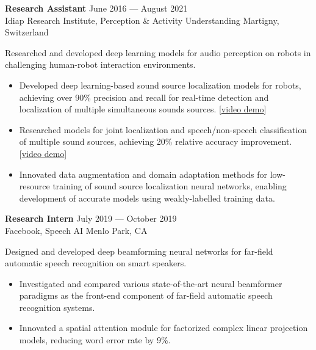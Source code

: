 \documentclass[a4paper,9pt]{extarticle} %
\begin{document}
\textbf{Research Assistant} \hfill June 2016 --- August 2021 \\
Idiap Research Institute, Perception \& Activity Understanding  \hfill Martigny, Switzerland \\
\vspace{-1.5\parskip}

Researched and developed deep learning models for audio perception on robots in challenging human-robot interaction environments.
\vspace{-.9\parskip}
\begin{itemize}[nosep]
  \item Developed deep learning-based sound source localization models for robots, achieving over 90\% precision and recall for real-time detection and localization of multiple simultaneous sounds sources. [\href{https://www.youtube.com/watch?v=_4EwuVlE_pU}{video demo}]
  \item Researched models for joint localization and speech/non-speech classification of multiple sound sources, achieving 20\% relative accuracy improvement. [\href{https://www.youtube.com/watch?v=O7bQvg03RTc}{video demo}]
  \item Innovated data augmentation and domain adaptation methods for low-resource training of sound source localization neural networks, enabling development of accurate models using weakly-labelled training data.
\end{itemize}


\textbf{Research Intern} \hfill July 2019 --- October 2019 \\
Facebook, Speech AI  \hfill Menlo Park, CA \\
\vspace{-1.5\parskip}

Designed and developed deep beamforming neural networks for far-field automatic speech recognition on smart speakers.
\vspace{-0.9\parskip}
\begin{itemize}[nosep]
  \item Investigated and compared various state-of-the-art neural beamformer paradigms as the front-end component of far-field automatic speech recognition systems.
  \item Innovated a spatial attention module for factorized complex linear projection models, reducing word error rate by 9\%.
\end{itemize}
\end{document}
